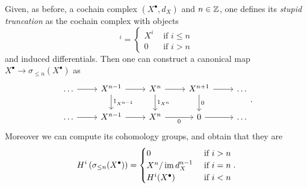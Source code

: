 \begin{defn}
	Given, as before, a cochain complex $\left( X^{\bullet}, d_{X} \right)$ and $n \in \mathbb{Z}$,
	one defines its	{\em stupid truncation} as the cochain complex with objects
	\begin{equation}
		[\sigma_{\leq n}(X^\bullet)]^i =
		\begin{cases}
			X^i & \text{ if } i \leq n\\
			0 & \text{ if } i > n
		\end{cases} 
	\end{equation} 
	and induced differentials.
	Then one can construct a canonical map $X^\bullet \to \sigma_{\leq n}(X^\bullet)$ as
	\begin{equation}
	\begin{tikzcd}
		\ldots \arrow[r, "", rightarrow] &
		X^{n-1} \arrow[r, "", rightarrow] \arrow[d, "1_{X^{n-1}}", rightarrow] &
		X^{n} \arrow[r, "", rightarrow] \arrow[d, "1_{X^{n}}", rightarrow] &
		X^{n+1} \arrow[r, "", rightarrow] \arrow[d, "0", rightarrow] &
		\ldots\\
		\ldots \arrow[r, "", rightarrow] &
		X^{n-1} \arrow[r, "", rightarrow] &
		X^{n} \arrow[r, "0"', rightarrow] &
		0 \arrow[r, "", rightarrow] &
		\ldots
	\end{tikzcd}
	.\end{equation} 
	Moreover we can compute its cohomology groups, and obtain that they are
	\begin{equation}
		H^i \left( \sigma_{\leq n}(X^\bullet) \right) =
		\begin{cases}
			0 & \text{ if } i > n\\
			X^n/\operatorname{im} d_X^{n-1} & \text{ if } i = n\\
			H^i(X^\bullet) & \text{ if } i < n
		\end{cases} 
	.\end{equation} 
\end{defn}

